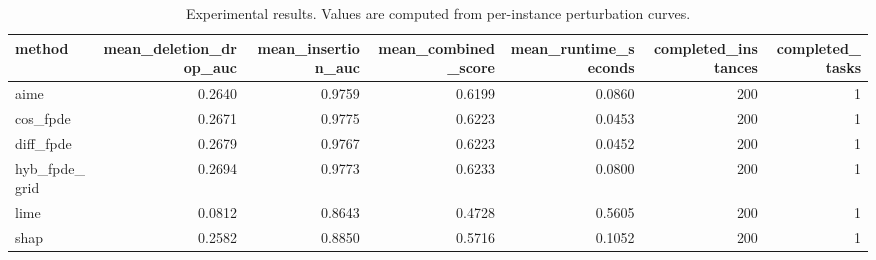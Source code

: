 \begin{table}[t]
\caption{Experimental results. Values are computed from per-instance perturbation curves.}
\label{tab:main_results_computed}
\centering
\begin{tabular}{lrrrrrr}
\toprule
method & mean\_deletion\_drop\_auc & mean\_insertion\_auc & mean\_combined\_score & mean\_runtime\_seconds & completed\_instances & completed\_tasks \\
\midrule
aime & 0.2640 & 0.9759 & 0.6199 & 0.0860 & 200 & 1 \\
cos\_fpde & 0.2671 & 0.9775 & 0.6223 & 0.0453 & 200 & 1 \\
diff\_fpde & 0.2679 & 0.9767 & 0.6223 & 0.0452 & 200 & 1 \\
hyb\_fpde\_grid & 0.2694 & 0.9773 & 0.6233 & 0.0800 & 200 & 1 \\
lime & 0.0812 & 0.8643 & 0.4728 & 0.5605 & 200 & 1 \\
shap & 0.2582 & 0.8850 & 0.5716 & 0.1052 & 200 & 1 \\
\bottomrule
\end{tabular}

\end{table}
